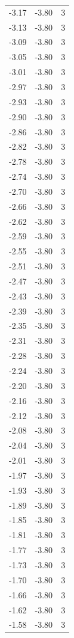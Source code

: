 \begin{longtable}{lrr}
  -3.17 & -3.80 & 3 \\
  -3.13 & -3.80 & 3 \\
  -3.09 & -3.80 & 3 \\
  -3.05 & -3.80 & 3 \\
  -3.01 & -3.80 & 3 \\
  -2.97 & -3.80 & 3 \\
  -2.93 & -3.80 & 3 \\
  -2.90 & -3.80 & 3 \\
  -2.86 & -3.80 & 3 \\
  -2.82 & -3.80 & 3 \\
  -2.78 & -3.80 & 3 \\
  -2.74 & -3.80 & 3 \\
  -2.70 & -3.80 & 3 \\
  -2.66 & -3.80 & 3 \\
  -2.62 & -3.80 & 3 \\
  -2.59 & -3.80 & 3 \\
  -2.55 & -3.80 & 3 \\
  -2.51 & -3.80 & 3 \\
  -2.47 & -3.80 & 3 \\
  -2.43 & -3.80 & 3 \\
  -2.39 & -3.80 & 3 \\
  -2.35 & -3.80 & 3 \\
  -2.31 & -3.80 & 3 \\
  -2.28 & -3.80 & 3 \\
  -2.24 & -3.80 & 3 \\
  -2.20 & -3.80 & 3 \\
  -2.16 & -3.80 & 3 \\
  -2.12 & -3.80 & 3 \\
  -2.08 & -3.80 & 3 \\
  -2.04 & -3.80 & 3 \\
  -2.01 & -3.80 & 3 \\
  -1.97 & -3.80 & 3 \\
  -1.93 & -3.80 & 3 \\
  -1.89 & -3.80 & 3 \\
  -1.85 & -3.80 & 3 \\
  -1.81 & -3.80 & 3 \\
  -1.77 & -3.80 & 3 \\
  -1.73 & -3.80 & 3 \\
  -1.70 & -3.80 & 3 \\
  -1.66 & -3.80 & 3 \\
  -1.62 & -3.80 & 3 \\
  -1.58 & -3.80 & 3 \\

\end{longtable}
